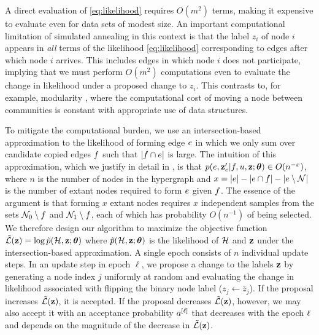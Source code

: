 \documentclass[aps,pre,reprint,superscriptaddress,nofootinbib]{revtex4-2}
\begin{document}
    A direct evaluation of \cref{eq:likelihood} requires $O(m^2)$ terms, making it expensive to evaluate even for data sets of modest size. 
    An important computational limitation of simulated annealing in this context is that the label $z_i$ of node $i$ appears in \emph{all} terms of the likelihood \cref{eq:likelihood} corresponding to edges after which node $i$ arrives. 
    This includes edges in which node $i$ does not participate, implying that we must perform $O(m^2)$ computations even to evaluate the change in likelihood under a proposed change to $z_i$.
    This contrasts to, for example, modularity \cite{newman2004finding}, where the computational cost of moving a node between communities is constant with appropriate use of data structures. 
    
    
    To mitigate the computational burden, we use an intersection-based approximation to the likelihood of forming edge $e$ in which we only sum over candidate copied edges $f$ such that $\left| f \cap e \right|$ is large.
    The intuition of this approximation, which we justify in detail in , is that $p(e, \mathbf{z}_e'|f, u, \mathbf{z}; \boldsymbol{\theta})\in O(n^{-x})$, where $n$ is the number of nodes in the hypergraph and $x = \left| e \right| - \left| e\cap f \right| - \left| e \setminus \mathcal{N} \right|$ is the number of extant nodes required to form $e$ given $f$. 
    The essence of the argument is that forming $x$ extant nodes requires $x$ independent samples from the sets $\mathcal{N}_0\setminus f$ and $\mathcal{N}_1\setminus f$, each of which has probability $O(n^{-1})$ of being selected.
    We  therefore design our algorithm to maximize the objective function $\tilde{\mathcal{L}}(\mathbf{z}) = \log \tilde{p}(\mathcal{H}, \mathbf{z} ; \boldsymbol{\theta})$
    where $\tilde{p}(\mathcal{H}, \mathbf{z} ; \boldsymbol{\theta})$ is the likelihood of $\mathcal{H}$ and $\mathbf{z}$ under the intersection-based approximation.
    A single epoch consists of $n$ individual update steps. 
    In an update step in epoch $\ell$, we propose a change to the labels $\mathbf{z}$ by generating a node index $j$ uniformly at random and evaluating the change in likelihood associated with flipping the binary node label ($z_j \gets \bar{z}_j$).  
    If the proposal increases $\tilde{\mathcal{L}}(\mathbf{z})$, it is accepted.
    If the proposal decreases $\tilde{\mathcal{L}}(\mathbf{z})$, however, we may also accept it with an acceptance probability $a^{[\ell]}$ that decreases with the epoch $\ell$ and depends on the magnitude of the decrease in $\tilde{\mathcal{L}}(\mathbf{z})$.
\end{document}
